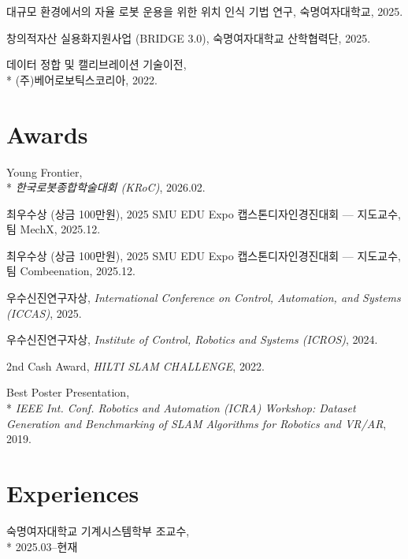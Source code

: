 \documentclass[margin]{res}
\begin{document}
\begin{resume}
		\par 대규모 환경에서의 자율 로봇 운용을 위한 위치 인식 기법 연구, 숙명여자대학교, 2025.

		\par 창의적자산 실용화지원사업 (BRIDGE 3.0), 숙명여자대학교 산학협력단, 2025.

		\par 데이터 정합 및 캘리브레이션 기술이전,\\*
		(주)베어로보틱스코리아, 2022.

		\section{Awards}
		\par Young Frontier,\\*
		\textit{한국로봇종합학술대회 (KRoC)}, 2026.02.

		\par 최우수상 (상금 100만원), 2025 SMU EDU Expo 캡스톤디자인경진대회 --- 지도교수, 팀 MechX, 2025.12.

		\par 최우수상 (상금 100만원), 2025 SMU EDU Expo 캡스톤디자인경진대회 --- 지도교수, 팀 \mbox{Combeenation}, 2025.12.

		\par 우수신진연구자상, \textit{International Conference on Control, Automation, and Systems (ICCAS)}, 2025.

		\par 우수신진연구자상, \textit{Institute of Control, Robotics and Systems (ICROS)}, 2024.

		\par 2nd Cash Award, \textit{HILTI SLAM CHALLENGE}, 2022.

		\par Best Poster Presentation,\\*
		\textit{IEEE Int. Conf. Robotics and Automation (ICRA) Workshop: Dataset Generation and Benchmarking of SLAM Algorithms for Robotics and VR/AR}, 2019.
		\section{Experiences}
		\par 숙명여자대학교 기계시스템학부 조교수,\\*
		2025.03--현재


\end{resume}
\end{document}
